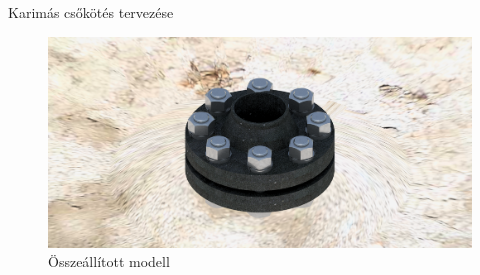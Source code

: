 \documentclass{article}
\begin{document}
	

	\maketitle

	\rule{0pt}{10pt}
	\begin{center}{\Large{Karimás csőkötés tervezése}}\end{center}

	\rule{0pt}{100pt}
	\begin{figure}[hbt!]
		\centering
		\includegraphics[scale=.34]{./images/assembly.png}
		\caption{Összeállított modell}
	\end{figure}

	
	
	\tableofcontents

	\newpage
	
	
	\newpage

	
	\newpage

	
	\newpage

	
	
	\newpage

	
	\newpage
	
	
\end{document}
